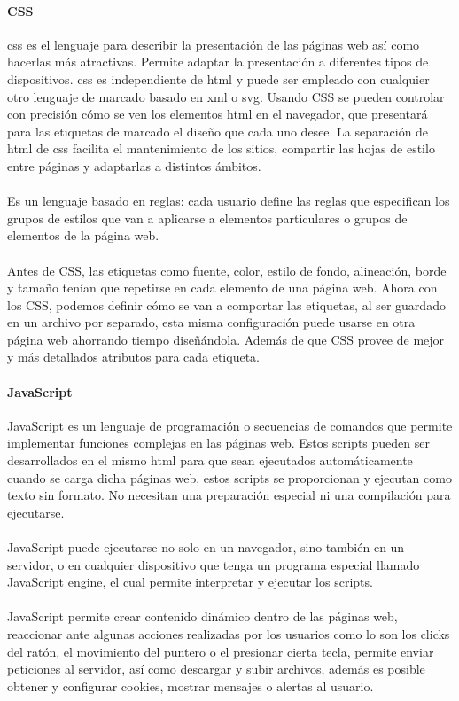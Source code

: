 \documentclass[12pt, a4paper, titlepage]{report}
\begin{document}
	   	\paragraph{CSS\\}
	   	
	   	\acrfull{css} es el lenguaje para describir la presentación de las páginas web así como hacerlas más atractivas. Permite adaptar la presentación a diferentes tipos de dispositivos. \acrshort{css} es independiente de \acrshort{html} y puede ser empleado con cualquier otro lenguaje de marcado basado en \acrshort{xml} o \acrshort{svg}. Usando CSS se pueden controlar con precisión cómo se ven los elementos \acrshort{html} en el navegador, que presentará para las etiquetas de marcado el diseño que cada uno desee. La separación de \acrshort{html} de \acrshort{css} facilita el mantenimiento de los sitios, compartir las hojas de estilo entre páginas y adaptarlas a distintos ámbitos. \cite{refcss}\\\\
	   	Es un lenguaje basado en reglas: cada usuario define las reglas que especifican los grupos de estilos que van a aplicarse a elementos particulares o grupos de elementos de la página web.\\\\
	   	Antes de CSS, las etiquetas como fuente, color, estilo de fondo, alineación, borde y tamaño tenían que repetirse en cada elemento de una página web. Ahora con los CSS, podemos definir cómo se van a comportar las etiquetas, al ser guardado en un archivo por separado, esta misma configuración puede usarse en otra página web ahorrando tiempo diseñándola. Además de que CSS provee de mejor y más detallados atributos para cada etiqueta.
	   	
	   	\paragraph {JavaScript \\}
	   	
	   	JavaScript es un lenguaje de programación o secuencias de comandos que permite implementar funciones complejas en las páginas web. Estos scripts pueden ser desarrollados en el mismo \acrshort{html} para que sean ejecutados automáticamente cuando se carga dicha páginas web, estos scripts se proporcionan y ejecutan como texto sin formato. No necesitan una preparación especial ni una compilación para ejecutarse. \cite{refjs}\\\\
	   	JavaScript puede ejecutarse no solo en un navegador, sino también en un servidor, o en cualquier dispositivo que tenga un programa especial llamado JavaScript engine, el cual permite interpretar y ejecutar los scripts.\\\\
	   	JavaScript permite crear contenido dinámico dentro de las páginas web, reaccionar ante algunas acciones realizadas por los usuarios como lo son los clicks del ratón, el movimiento del puntero o el presionar cierta tecla, permite enviar peticiones al servidor, así como descargar y subir archivos, además es posible obtener y configurar cookies, mostrar mensajes o alertas al usuario.
	   	
\end{document}
